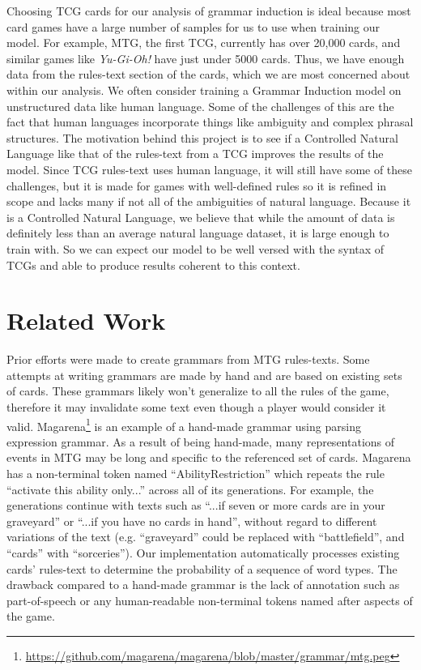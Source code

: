 \documentclass[11pt,a4paper]{article}
\begin{document}
Choosing TCG cards for our analysis of grammar induction is ideal because most card games have a large number of samples for us to use when training our model. For example, MTG, the first TCG, currently has over 20,000 cards, and similar games like \emph{Yu-Gi-Oh!} have just under 5000 cards. Thus, we have enough data from the rules-text section of the cards, which we are most concerned about within our analysis. We often consider training a Grammar Induction model on unstructured data like human language. Some of the challenges of this are the fact that human languages incorporate things like ambiguity and complex phrasal structures. The motivation behind this project is to see if a Controlled Natural Language like that of the rules-text from a TCG improves the results of the model. Since TCG rules-text uses human language, it will still have some of these challenges, but it is made for games with well-defined rules so it is refined in scope and lacks many if not all of the ambiguities of natural language. Because it is a Controlled Natural Language, we believe that while the amount of data is definitely less than an average natural language dataset, it is large enough to train with. So we can expect our model to be well versed with the syntax of TCGs and able to produce results coherent to this context.

\section{Related Work}
Prior efforts were made to create grammars from MTG rules-texts. Some attempts at writing grammars are made by hand and are based on existing sets of cards. These grammars likely won’t generalize to all the rules of the game, therefore it may invalidate some text even though a player would consider it valid. Magarena\footnote{\url{https://github.com/magarena/magarena/blob/master/grammar/mtg.peg}} is an example of a hand-made grammar using parsing expression grammar. As a result of being hand-made, many representations of events in MTG may be long and specific to the referenced set of cards. Magarena has a non-terminal token named “AbilityRestriction” which repeats the rule “activate this ability only...” across all of its generations. For example, the generations continue with texts such as “...if seven or more cards are in your graveyard” or “...if you have no cards in hand”, without regard to different variations of the text (e.g. “graveyard” could be replaced with “battlefield”, and “cards” with “sorceries”). Our implementation automatically processes existing cards’ rules-text to determine the probability of a sequence of word types. The drawback compared to a hand-made grammar is the lack of annotation such as part-of-speech or any human-readable non-terminal tokens named after aspects of the game.
\end{document}
